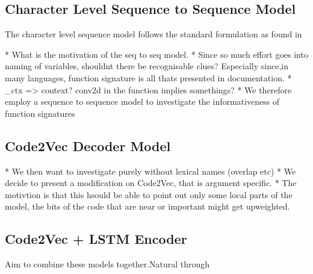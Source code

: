 








\subsection{Character Level Sequence to Sequence Model} %
\label{sec:character_level_sequence_to_sequence}

The character level sequence model follows the standard formulation as found in \cite{bahdanau_neural_2014}

* What is the motivation of the seq to seq model.
* Since so much effort goes into naming of variables, shouldnt there be recognisable clues? Especially since,in many languages, function signature is all thats presented in documentation.
* \_ctx => context? conv2d in the function implies somethings?
* We therefore employ a sequence to sequence model to investigate the informativeness of function signatures




\subsection{Code2Vec Decoder Model} %
\label{sec:code2vec_decoder_model}

* We then want to investigate purely without lexical names (overlap etc)
* We decide to present a modification on Code2Vec, that is argument specific.
* The motivtion is that this hsould be able to point out only some local parts of the model, the bits of the code that are near or important might get upweighted.



\subsection{Code2Vec + LSTM Encoder} %
\label{sub:code2vec_sequence_to_sequence}

Aim to combine these models together.Natural through 

